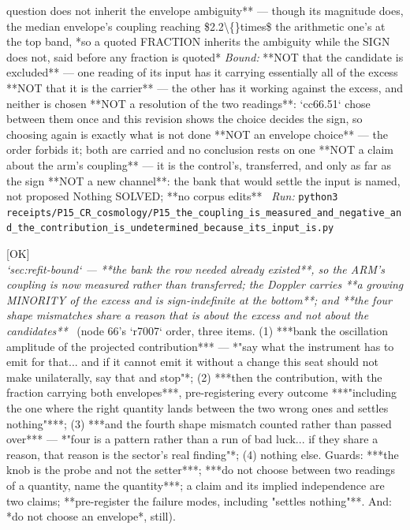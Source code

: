 \begin{description}
question does not inherit the envelope ambiguity** --- though its magnitude does, the median envelope's coupling reaching \$2.2\textbackslash\{\}times\$ the arithmetic one's at the top band, *so a quoted FRACTION inherits the ambiguity while the SIGN does not, said before any fraction is quoted*
 \emph{Bound:}  **NOT that the candidate is excluded** --- one reading of its input has it carrying essentially all of the excess  **NOT that it is the carrier** --- the other has it working against the excess, and neither is chosen  **NOT a resolution of the two readings**: `cc66.51` chose between them once and this revision shows the choice decides the sign, so choosing again is exactly what is not done  **NOT an envelope choice** --- the order forbids it; both are carried and no conclusion rests on one  **NOT a claim about the arm's coupling** --- it is the control's, transferred, and only as far as the sign  **NOT a new channel**: the bank that would settle the input is named, not proposed  Nothing SOLVED; **no corpus edits**
\ \emph{Run:} \texttt{python3 receipts/P15\_CR\_cosmology/P15\_the\_coupling\_is\_measured\_and\_negative\_and\_the\_contribution\_is\_undetermined\_because\_its\_input\_is.py}
\item[\rcptlabel{P15_the_bank_already_existed_and_the_doppler_carries_a_growing_minority_of_the_excess}{P15R203}\textbf{P15R203}\quad\texttt{P15\_the\_bank\_already\_existed\_and\_the\_doppler\_carries\_a\_growing\_minority\_of\_the\_excess}]\hfill\textsf{[OK]}\\
\textit{`sec:refit-bound` --- **the bank the row needed already existed**, so the ARM's coupling is now measured rather than transferred; the Doppler carries **a growing MINORITY of the excess and is sign-indefinite at the bottom**; and **the four shape mismatches share a reason that is about the excess and not about the candidates**} \ (node 66's `r7007` order, three items. (1) ***bank the oscillation amplitude of the projected contribution*** --- *"say what the instrument has to emit for that... and if it cannot emit it without a change this seat should not make unilaterally, say that and stop"*; (2) ***then the contribution, with the fraction carrying both envelopes***, pre-registering every outcome ***"including the one where the right quantity lands between the two wrong ones and settles nothing"***; (3) ***and the fourth shape mismatch counted rather than passed over*** --- *"four is a pattern rather than a run of bad luck... if they share a reason, that reason is the sector's real finding"*; (4) nothing else.  Guards: ***the knob is the probe and not the setter***; ***do not choose between two readings of a quantity, name the quantity***; a claim and its implied independence are two claims; **pre-register the failure modes, including "settles nothing"**.  And: *do not choose an envelope*, still). 

\end{description}
